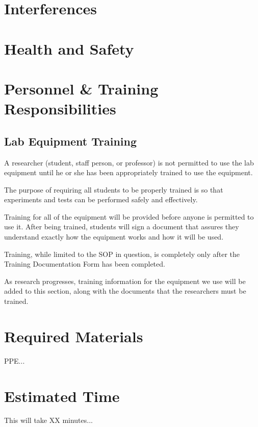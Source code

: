 \documentclass[12pt]{../SOP2}
\begin{document}
\section{Interferences}

\section{Health and Safety}

\NP 

\section{Personnel \& Training Responsibilities}

\subsection*{Lab Equipment Training}

\NP A researcher (student, staff person, or professor) is not permitted to use the lab equipment until he or she has been appropriately trained to use the equipment.

\NP The purpose of requiring all students to be properly trained is so that experiments and tests can be performed safely and effectively.  

\NP Training for all of the equipment will be provided before anyone is permitted to use it.  After being trained, students will sign a document that assures they understand exactly how the equipment works and how it will be used.

\NP Training, while limited to the SOP in question, is completely only after the Training Documentation Form has been completed.

\NP As research progresses, training information for the equipment we use will be added to this section, along with the documents that the researchers must be trained.

\section{Required Materials}

\NP PPE...



\section{Estimated Time}

\NP This will take XX minutes...
\end{document}
